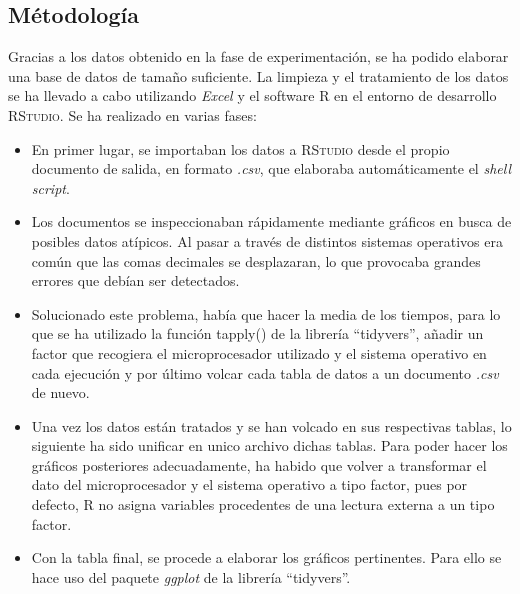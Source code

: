 \documentclass[12pt,a4paper]{article}
\begin{document}
\vspace{0.2cm}
\subsection{Métodología}
Gracias a los datos obtenido en la fase de experimentación, se ha podido elaborar una base de datos de tamaño suficiente. La limpieza y el tratamiento de los datos se ha llevado a cabo utilizando \textit{Excel} y el software \textsc{R} en el entorno de desarrollo \textsc{RStudio}. Se ha realizado en varias fases: 
\begin{itemize}
	\item En primer lugar, se importaban los datos a \textsc{RStudio} desde el propio documento de salida, en formato \textit{.csv}, que elaboraba automáticamente el \textit{shell script}. 
	\item Los documentos se inspeccionaban rápidamente mediante gráficos en busca de posibles datos atípicos. Al pasar a través de distintos sistemas operativos era común que las comas decimales se desplazaran, lo que provocaba grandes errores que debían ser detectados.
	\item Solucionado este problema, había que hacer la media de los tiempos, para lo que se ha utilizado la función \textsf{tapply()} de la librería ``tidyvers'', añadir un factor que recogiera el microprocesador utilizado y el sistema operativo en cada ejecución y por último volcar cada tabla de datos a un documento \textit{.csv} de nuevo.
	\item Una vez los datos están tratados y se han volcado en sus respectivas tablas, lo siguiente ha sido unificar en unico archivo dichas tablas. Para poder hacer los gráficos posteriores adecuadamente, ha habido que volver a transformar el dato del microprocesador y el sistema operativo a tipo factor, pues por defecto, \textsc{R} no asigna variables procedentes de una lectura externa a un tipo factor. 
	\item Con la tabla final, se procede a elaborar los gráficos pertinentes. Para ello se hace uso del paquete \textit{ggplot} de la librería ``tidyvers''.
\end{itemize}
 
\end{document}
